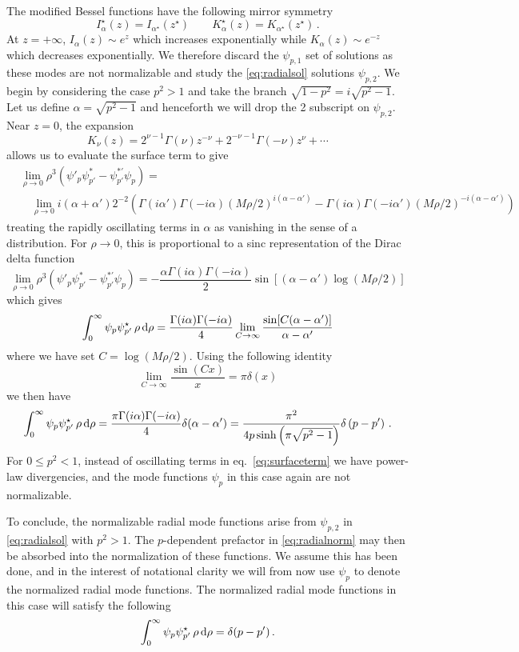 \documentclass{brownthesis}
\def\dd{{\rm d}}
\begin{document}
The modified Bessel functions have the following mirror symmetry
\[
I_{\alpha}^{\star}(z)=I_{\alpha^{\star}}(z^{\star})\qquad K_{\alpha}^{\star}(z)=K_{\alpha^{\star}}(z^{\star})\,.
\]
At $z=+\infty$, $I_{\alpha}(z)\sim e^{z}$ which increases exponentially
while $K_{\alpha}(z)\sim e^{-z}$ which decreases exponentially. We
therefore discard the $\psi_{p,1}$ set of solutions as these modes
are not normalizable and study the \eqref{eq:radialsol} solutions
$\psi_{p,2}$. We begin by considering the case $p^{2}>1$ and take
the branch $\sqrt{1-p^{2}}=i\sqrt{p^{2}-1}$. Let us define $\alpha=\sqrt{p^{2}-1}$
and henceforth we will drop the 2 subscript on $\psi_{p,2}$. Near
$z=0$, the expansion
\[
K_{\nu}(z)=2^{\nu-1}\Gamma(\nu)z^{-\nu}+2^{-\nu-1}\Gamma(-\nu)z^{\nu}+\cdots
\]
allows us to evaluate the surface term to give
\begin{align}
 & \lim_{\rho\to0}\rho^{3}\left(\psi'_{p}\psi_{p'}^{*}-\psi_{p'}^{*'}\psi_{p}\right)=\nonumber \\
 & \quad\lim_{\rho\to0}i(\alpha+\alpha')2^{-2}\left(\Gamma(i\alpha')\Gamma(-i\alpha)(M\rho/2)^{i(\alpha-\alpha')}-\Gamma(i\alpha)\Gamma(-i\alpha')(M\rho/2)^{-i(\alpha-\alpha')}\right)\label{eq:surfaceterm}
\end{align}
treating the rapidly oscillating terms in $\alpha$ as vanishing in
the sense of a distribution. For $\rho\to0$, this is proportional
to a sinc representation of the Dirac delta function
\[
\lim_{\rho\to0}\rho^{3}\left(\psi'_{p}\psi_{p'}^{*}-\psi_{p'}^{*'}\psi_{p}\right)=-\frac{\alpha\Gamma(i\alpha)\Gamma(-i\alpha)}{2}\sin\left[(\alpha-\alpha')\log(M\rho/2)\right]
\]
which gives
\[
\int_{0}^{\infty}\psi_{p}\psi_{p'}^{\star}\,\rho\,\dd\rho=\frac{\Gamma(i\alpha)\Gamma(-i\alpha)}{4}\lim_{C\to\infty}\frac{\sin[C(\alpha-\alpha')]}{\alpha-\alpha'}
\]
where we have set $C=\log(M\rho/2)$. Using the following identity
\[
\lim_{C\to\infty}\frac{\sin(Cx)}{x}=\pi\delta(x)
\]
we then have
\begin{equation}
\int_{0}^{\infty}\psi_{p}\psi_{p'}^{\star}\,\rho\,\dd\rho=\frac{\pi\Gamma(i\alpha)\Gamma(-i\alpha)}{4}\delta(\alpha-\alpha')=\frac{\pi^{2}}{4p\sinh\left(\pi\sqrt{p^{2}-1}\right)}\delta\left(p-p'\right)\,.\label{eq:radialnorm}
\end{equation}
 For $0\le p^{2}<1$, instead of oscillating terms in eq.~\ref{eq:surfaceterm}
we have power-law divergencies, and the mode functions $\psi_{p}$
in this case again are not normalizable.

To conclude, the normalizable radial mode functions arise from $\psi_{p,2}$
in \eqref{eq:radialsol} with $p^{2}>1$. The $p$-dependent prefactor
in \eqref{eq:radialnorm} may then be absorbed into the normalization
of these functions. We assume this has been done, and in the interest
of notational clarity we will from now use $\psi_{p}$ to denote the
normalized radial mode functions. The normalized radial mode functions
in this case will satisfy the following
\begin{equation}
\int_{0}^{\infty}\psi_{p}\psi_{p'}^{\star}\,\rho\,\dd\rho=\delta(p-p')\,.\label{eq:radialinnerprod}
\end{equation}
\end{document}
